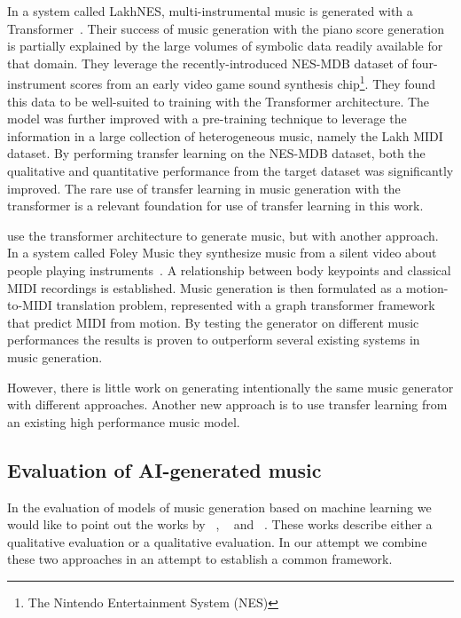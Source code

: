 \documentclass{IEEEtran}
\begin{document}
In a system called LakhNES,
multi-instrumental music is generated with a Transformer~\cite{donahue2019lakhnes}.
Their success of music generation with the piano score generation is
partially explained by the large volumes of symbolic data readily available
for that domain. They leverage the recently-introduced NES-MDB dataset of
four-instrument scores from an early video game sound synthesis
chip\footnote{The Nintendo Entertainment System (NES)}. They found this data
to be well-suited to training with the Transformer architecture. The model
was further improved with a pre-training technique to leverage the
information in a large collection of heterogeneous music, namely the Lakh
MIDI dataset. By performing transfer learning on the NES-MDB dataset, both
the qualitative and quantitative performance from the target dataset was
significantly improved. The rare use of transfer learning in music generation
with the transformer is a relevant foundation for use of transfer learning in
this work.

\citeauthor{gan2020foley} use the transformer architecture to generate music,
but with another approach. In a system called Foley Music they synthesize
music from a silent video about people playing
instruments~\cite{gan2020foley}. A relationship between body keypoints and
classical MIDI recordings is established. Music generation is then formulated
as a motion-to-MIDI translation problem, represented with a graph transformer
framework that predict MIDI from motion. By testing the generator on
different music performances the results is proven to outperform several
existing systems in music generation.

However, there is little work on generating intentionally the same music
generator with different approaches. Another new approach is to use transfer
learning from an existing high performance music model.

\subsection{Evaluation of AI-generated music}

In the evaluation of models of
music generation based on machine learning we would like to point out the
works by \citeauthor{1030094}~\cite{1030094},
\citeauthor{yang2020evaluation}~\cite{yang2020evaluation} and
\citeauthor{wu2020jazz}~\cite{wu2020jazz}. These works describe either a
qualitative evaluation or a qualitative evaluation. In our attempt we combine
these two approaches in an attempt to establish a common framework.
\end{document}
